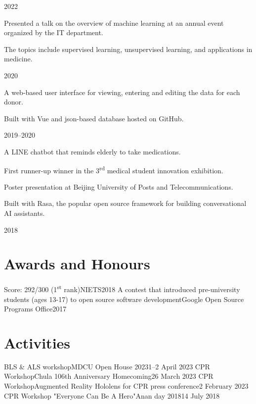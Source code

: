 \documentclass{cv}
\begin{document}
\begin{cv_table}
{  }{}{2022}
  {\begin{cv_itemize}
      \item Presented a talk on the overview of machine learning at an annual event organized by the IT department.
      \item The topics include supervised learning, unsupervised learning, and applications in medicine.
    \end{cv_itemize}
  }{}{2020}
  {\begin{cv_itemize}
      \item A web-based user interface for viewing, entering and editing the data for each donor.
      \item Built with Vue and json-based database hosted on GitHub.
    \end{cv_itemize}
  }{}{2019--2020}
  {\begin{cv_itemize}
      \item A LINE chatbot that reminds elderly to take medications.
      \item First runner-up winner in the 3\textsuperscript{rd} medical student innovation exhibition.
      \item Poster presentation at Beijing University of Posts and Telecommunications.
      \item Built with Rasa, the popular open source framework for building conversational AI assistants.
    \end{cv_itemize}
  }{}{2018}
\end{cv_table}

\section{Awards and Honours}
\begin{cv_table}
  {Score: 292/300 (1\textsuperscript{st} rank)}{NIETS}{2018}
  {A contest that introduced pre-university students (ages 13-17) to open source software development}{Google Open Source Programs Office}{2017}
\end{cv_table}

\section{Activities}
\begin{cv_table}
  {BLS \& ALS workshop}{MDCU Open House 2023}{1--2 April 2023}
  {CPR Workshop}{Chula 106th Anniversary Homecoming}{26 March 2023}
  {CPR Workshop}{Augmented Reality Hololens for CPR press conference}{2 February 2023}
  {CPR Workshop "Everyone Can Be A Hero"}{Anan day 2018}{14 July 2018}
\end{cv_table}
\end{document}
